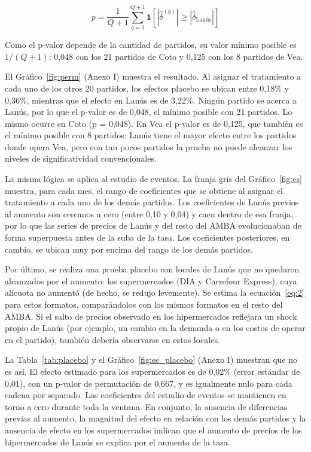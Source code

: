 \begin{equation}\label{eq:7}
  p = \frac{1}{Q + 1}\sum_{q = 1}^{Q + 1}\mathbf{1}\left\lbrack \left| {\widehat{\delta}}^{(q)} \right| \geq \left| {\widehat{\delta}}_{\text{Lanús}} \right| \right\rbrack
\end{equation}

Como el p-valor depende de la cantidad de partidos, su valor mínimo posible es \(1/(Q + 1)\): 0,048 con los 21 partidos de Coto y 0,125 con los 8 partidos de Vea.

El Gráfico~\ref{fig:perm} (Anexo I) muestra el resultado. Al asignar el tratamiento a cada uno de los otros 20 partidos, los efectos placebo se ubican entre \textminus{}0,18\% y 0,36\%, mientras que el efecto en Lanús es de 3,22\%. Ningún partido se acerca a Lanús, por lo que el p-valor es de 0,048, el mínimo posible con 21 partidos. Lo mismo ocurre en Coto (p = 0,048). En Vea el p-valor es de 0,125, que también es el mínimo posible con 8 partidos: Lanús tiene el mayor efecto entre los partidos donde opera Vea, pero con tan pocos partidos la prueba no puede alcanzar los niveles de significatividad convencionales.

La misma lógica se aplica al estudio de eventos. La franja gris del Gráfico~\ref{fig:es} muestra, para cada mes, el rango de coeficientes que se obtiene al asignar el tratamiento a cada uno de los demás partidos. Los coeficientes de Lanús previos al aumento son cercanos a cero (entre \textminus{}0,10 y 0,04) y caen dentro de esa franja, por lo que las series de precios de Lanús y del resto del AMBA evolucionaban de forma superpuesta antes de la suba de la tasa. Los coeficientes posteriores, en cambio, se ubican muy por encima del rango de los demás partidos.

Por último, se realiza una prueba placebo con locales de Lanús que no quedaron alcanzados por el aumento: los supermercados (DIA y Carrefour Express), cuya alícuota no aumentó (de hecho, se redujo levemente). Se estima la ecuación~\eqref{eq:2} para estos formatos, comparándolos con los mismos formatos en el resto del AMBA. Si el salto de precios observado en los hipermercados reflejara un shock propio de Lanús (por ejemplo, un cambio en la demanda o en los costos de operar en el partido), también debería observarse en estos locales.

La Tabla~\ref{tab:placebo} y el Gráfico~\ref{fig:es_placebo} (Anexo I) muestran que no es así. El efecto estimado para los supermercados es de \textminus{}0,02\% (error estándar de 0,01), con un p-valor de permutación de 0,667, y es igualmente nulo para cada cadena por separado. Los coeficientes del estudio de eventos se mantienen en torno a cero durante toda la ventana. En conjunto, la ausencia de diferencias previas al aumento, la magnitud del efecto en relación con los demás partidos y la ausencia de efecto en los supermercados indican que el aumento de precios de los hipermercados de Lanús se explica por el aumento de la tasa.

